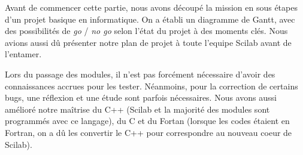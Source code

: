 Avant de commencer cette partie, nous avons découp\'e la mission
en sous étapes d'un projet basique en informatique.
On a établi un diagramme de Gantt, avec des possibilités de
{\it go} / {\it no go} selon l'état du projet à des moments cl\'es.
Nous avions aussi d\^u présenter notre plan de projet à toute
l'equipe Scilab avant de l'entamer.

Lors du passage des modules, il n'est pas forcément nécessaire d'avoir
des connaissances accrues pour les tester.
N\'eanmoins, pour la correction de certains bugs,
une réflexion et une étude sont parfois n\'ecessaires.
Nous avons aussi amélioré notre ma\^itrise du C++
(Scilab et la majorité des modules sont programmés avec ce langage),
du C et du Fortan (lorsque les codes \'etaient en Fortran,
on a d\^u les convertir le C++ pour correspondre au nouveau
coeur de Scilab).
